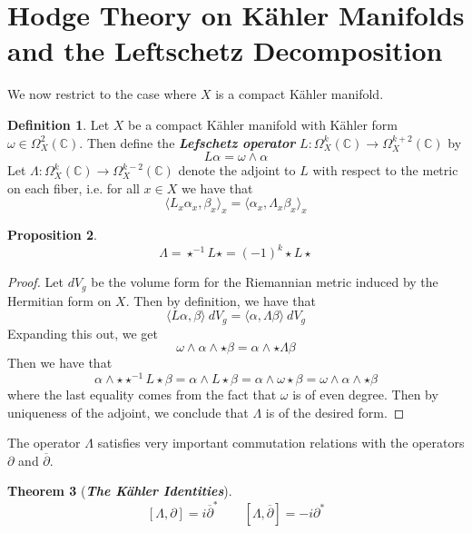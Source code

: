 \documentclass[psamsfonts, 12pt]{amsart}
\newtheorem{thm}{Theorem}[section]
\newtheorem{prop}[thm]{Proposition}
\theoremstyle{definition}
\newtheorem{defn}[thm]{Definition}
\theoremstyle{remark}
\newcommand{\ib}[1]{\textbf{\textit{#1}}}
\newcommand{\C}{\mathbb{C}}
\newcommand{\dbar}{\overline{\partial}}
\newcommand{\inv}{^{-1}}
\begin{document}
\section{Hodge Theory on K\"ahler Manifolds and the Leftschetz Decomposition}
%
We now restrict to the case where $X$ is a compact K\"ahler manifold.
%
\begin{defn}
Let $X$ be a compact K\"ahler manifold with K\"ahler form $\omega \in \Omega^2_X(\C)$.
Then define the \ib{Lefschetz operator} $L : \Omega^k_X(\C) \to \Omega^{k+2}_X(\C)$ by
\[
L\alpha = \omega \wedge \alpha
\]
Let $\Lambda : \Omega^k_X(\C) \to \Omega^{k-2}_X(\C)$ denote the adjoint to $L$ with
respect to the metric on each fiber, i.e. for all $x \in X$ we have that
\[
\langle L_x\alpha_x,\beta_x\rangle_x = \langle\alpha_x,\Lambda_x\beta_x\rangle_x
\]
\end{defn}
%
\begin{prop}
\[
\Lambda = \star\inv L\star = (-1)^k\star L\star
\]
\end{prop}
%
\begin{proof}
Let $dV_g$ be the volume form for the Riemannian metric induced by the Hermitian form
on $X$. Then by definition, we have that
\[
\langle L\alpha,\beta\rangle~dV_g = \langle\alpha,\Lambda\beta\rangle~dV_g
\]
Expanding this out, we get
\[
\omega\wedge\alpha\wedge\star\beta = \alpha\wedge\star\Lambda\beta
\]
Then we have that
\[
\alpha\wedge\star\star\inv L\star\beta = \alpha\wedge L\star\beta
=\alpha\wedge\omega\star\beta = \omega\wedge\alpha\wedge\star\beta
\]
where the last equality comes from the fact that $\omega$ is of even degree. Then
by uniqueness of the adjoint, we conclude that $\Lambda$ is of the desired form.
\end{proof}
%
The operator $\Lambda$ satisfies very important commutation relations with
the operators $\partial$ and $\dbar$.
%
\begin{thm}[\ib{The K\"ahler Identities}]
\[
[\Lambda,\partial] = i\dbar^* \qquad [\Lambda,\dbar] = -i\partial^*
\]
\end{thm}
%
\end{document}
